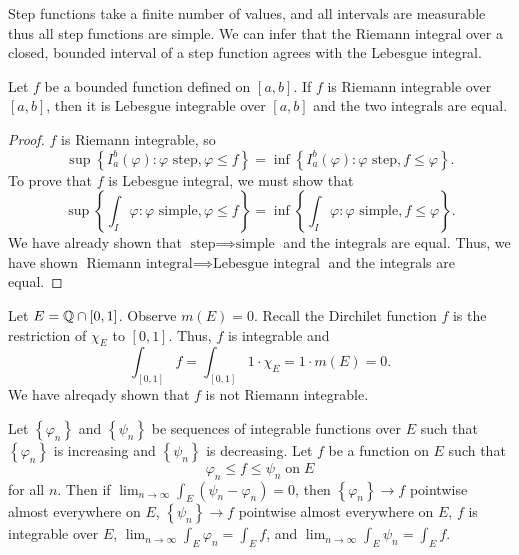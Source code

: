 
Step functions take a finite number of values, and all intervals are
measurable thus all step functions are simple.
We can infer that the Riemann integral over a closed, bounded interval
of a step function agrees with the Lebesgue integral.

\begin{theorem}
	Let $f$ be a bounded function defined on $[a,b]$.
	If $f$ is Riemann integrable over $[a,b]$, then
	it is Lebesgue integrable over $[a,b]$ and the two integrals are equal.
\end{theorem}

\begin{proof}
	$f$ is Riemann integrable, so
	\[
		\sup\left\{ 
			I_a^b(\varphi): \text{$\varphi$ step}, 
			\varphi \leq f 
		\right\}
		= \inf\left\{ I_a^b(\varphi): 
		\text{$\varphi$ step}, 
		f \leq \varphi \right
		\}.
	\]
	To prove that $f$ is Lebesgue integral, we must show that 
	\[
		\sup\left\{ 
			\int_I \varphi:
			\text{$\varphi$ simple},
			\varphi \leq f
		 \right\}
		 = \inf\left\{ 
			 \int_I \varphi:
			 \text{$\varphi$ simple},
			 f \leq \varphi
		\right\}.
	\]
	We have already shown that $\text{step} \implies \text{simple}$
	and the integrals are equal.
	Thus, we have shown 
	$\text{Riemann integral} \implies \text{Lebesgue integral}$ and the
	integrals are equal.
\end{proof}

\begin{example}
	Let $E = \mathbb{Q} \cap [0,1]$.
	Observe $m(E) = 0$.
	Recall the Dirchilet function $f$ is the restriction of $\chi_E$
	to $[0,1]$.
	Thus, $f$ is integrable and
	\[
		\int_{[0,1]} f = \int_{[0,1]} 1 \cdot \chi_E
		= 1 \cdot m(E) = 0.
	\]
	We have alreqady shown that $f$ is not Riemann integrable.
\end{example}

\begin{lemma}
	Let $\left\{ \varphi_n \right\}$ and $\left\{ \psi_n \right\}$
	be sequences of integrable functions over $E$ such that
	$\left\{ \varphi_n \right\}$ is increasing and
	$\left\{ \psi_n \right\}$ is decreasing.
	Let $f$ be a function on $E$ such that
	\[
		\varphi_n \leq f \leq \psi_n \;\text{on}\; E
	\]
	for all $n$.
	Then if $\lim_{n \to \infty} \int_E \left( \psi_n  - \varphi_n \right) = 0$,
	then $\left\{ \varphi_n \right\} \to f$ pointwise almost everywhere on $E$,
	$\left\{ \psi_n \right\} \to f$ pointwise almost everywhere on $E$,
	$f$ is integrable over $E$,
	$\lim_{n \to \infty} \int_E \varphi_n = \int_E f$, and
	$\lim_{n \to \infty} \int_E \psi_n = \int_E f$.
\end{lemma}

